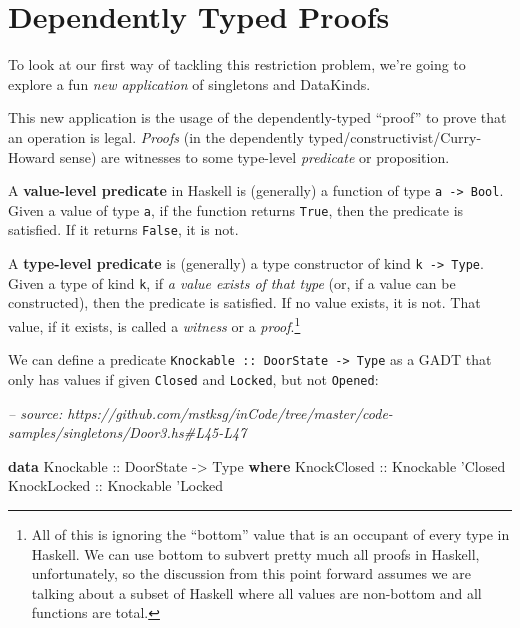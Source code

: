 \documentclass[]{article}
\newenvironment{Shaded}{}{}
\newcommand{\CommentTok}[1]{\textcolor[rgb]{0.38,0.63,0.69}{\textit{#1}}}
\newcommand{\DataTypeTok}[1]{\textcolor[rgb]{0.56,0.13,0.00}{#1}}
\newcommand{\KeywordTok}[1]{\textcolor[rgb]{0.00,0.44,0.13}{\textbf{#1}}}
\newcommand{\NormalTok}[1]{#1}
\newcommand{\OtherTok}[1]{\textcolor[rgb]{0.00,0.44,0.13}{#1}}
\begin{document}
\hypertarget{dependently-typed-proofs}{%
\section{Dependently Typed Proofs}\label{dependently-typed-proofs}}

To look at our first way of tackling this restriction problem, we're going to
explore a fun \emph{new application} of singletons and DataKinds.

This new application is the usage of the dependently-typed ``proof'' to prove
that an operation is legal. \emph{Proofs} (in the dependently
typed/constructivist/Curry-Howard sense) are witnesses to some type-level
\emph{predicate} or proposition.

A \textbf{value-level predicate} in Haskell is (generally) a function of type
\texttt{a\ -\textgreater{}\ Bool}. Given a value of type \texttt{a}, if the
function returns \texttt{True}, then the predicate is satisfied. If it returns
\texttt{False}, it is not.

A \textbf{type-level predicate} is (generally) a type constructor of kind
\texttt{k\ -\textgreater{}\ Type}. Given a type of kind \texttt{k}, if \emph{a
value exists of that type} (or, if a value can be constructed), then the
predicate is satisfied. If no value exists, it is not. That value, if it exists,
is called a \emph{witness} or a \emph{proof}.\footnote{All of this is ignoring
  the ``bottom'' value that is an occupant of every type in Haskell. We can use
  bottom to subvert pretty much all proofs in Haskell, unfortunately, so the
  discussion from this point forward assumes we are talking about a subset of
  Haskell where all values are non-bottom and all functions are total.}

We can define a predicate
\texttt{Knockable\ ::\ DoorState\ -\textgreater{}\ Type} as a GADT that only has
values if given \texttt{\textquotesingle{}Closed} and
\texttt{\textquotesingle{}Locked}, but not \texttt{\textquotesingle{}Opened}:

\begin{Shaded}
\begin{Highlighting}[]
\CommentTok{-- source: https://github.com/mstksg/inCode/tree/master/code-samples/singletons/Door3.hs#L45-L47}

\KeywordTok{data} \DataTypeTok{Knockable}\OtherTok{ ::} \DataTypeTok{DoorState} \OtherTok{->} \DataTypeTok{Type} \KeywordTok{where}
    \DataTypeTok{KnockClosed}\OtherTok{ ::} \DataTypeTok{Knockable}\NormalTok{ '}\DataTypeTok{Closed}
    \DataTypeTok{KnockLocked}\OtherTok{ ::} \DataTypeTok{Knockable}\NormalTok{ '}\DataTypeTok{Locked}
\end{Highlighting}
\end{Shaded}
\end{document}
